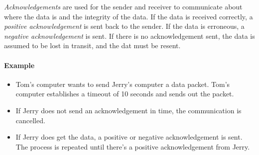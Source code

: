 \documentclass[../main.tex]{subfiles}
\begin{document}
\emph{Acknowledgements} are used for the sender and receiver to communicate about where the data is and the integrity of the data. If the data is received correctly, a \emph{positive acknowledgement} is sent back to the sender. If the data is erroneous, a \emph{negative acknowledgement} is sent. If there is no acknowledgement sent, the data is assumed to be lost in transit, and the dat must be resent.

\paragraph{Example}

\begin{itemize}
    \item Tom’s computer wants to send Jerry’s computer a data packet. Tom’s computer establishes a timeout of 10 seconds and sends out the packet.
    \item If Jerry does not send an acknowledgement in time, the communication is cancelled.
    \item If Jerry does get the data, a positive or negative acknowledgement is sent. The process is repeated until there's a positive acknowledgement from Jerry.
\end{itemize}
\end{document}
